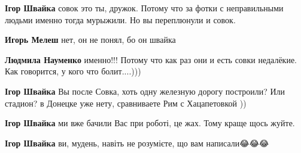 \begin{itemize}
\begin{itemize}
\textbf{Ігор Швайка} совок это ты, дружок. Потому что за фотки с неправильными людьми именно тогда мурыжили. Но вы переплюнули и совок.

 
\textbf{Игорь Мелеш} нет, он не понял, бо он швайка

 
\textbf{Людмила Науменко} именно!!! Потому что как раз они и есть совки недалёкие. Как говорится, у кого что болит....)))

 
\textbf{Ігор Швайка} Вы после Совка, хоть одну железную дорогу построили? Или стадион? в Донецке уже нету, сравниваете Рим с Хацапетовкой ))

 
\textbf{Ігор Швайка} ми вже бачили Вас при роботі, це жах. Тому краще щось жуйте.

 
\textbf{Ігор Швайка} ви, мудень, навіть не розумієте, що вам написали😂😂😂

 

\end{itemize}
\end{itemize}
